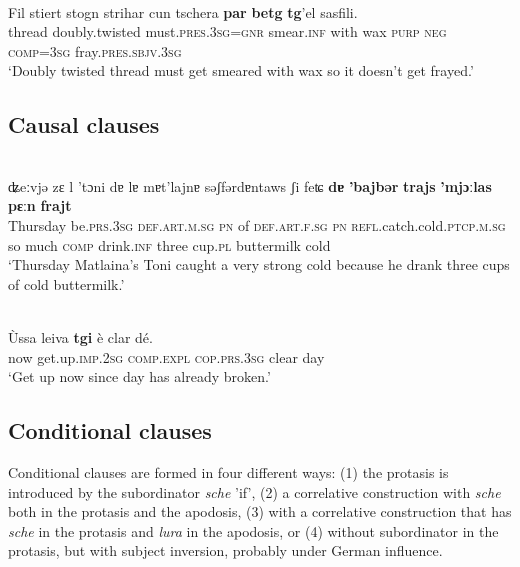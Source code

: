 \ea\label{}
\\
\gll   Fil stiert stogn strihar cun tschera \textbf{par} \textbf{betg} \textbf{tg}’el sasfili.\\
     thread doubly.twisted must.\textsc{pres.3sg=gnr} smear.\textsc{inf} with wax \textsc{purp} \textsc{neg} \textsc{comp=3sg} fray.\textsc{pres.sbjv.3sg}\\
\glt `Doubly twisted thread must get smeared with wax so it doesn’t get frayed.'
\z






\subsection{Causal clauses}
 
 \ea\label{ex:1:}
 {\citealt[9]{Valär2013b}}\\
\gll ʥeːvjǝ zɛ l 'tɔni dɐ lɐ mɐt'lajnɐ sǝʃfǝrdɐntaws ʃi feʨ \textbf{dɐ} \textbf{'bajbǝr} \textbf{trajs} \textbf{'mjɔːlas} \textbf{pɛːn} \textbf{frajt} \\
 Thursday  be.\textsc{prs.3sg}  \textsc{def.art.m.sg} \textsc{pn} of \textsc{def.art.f.sg} \textsc{pn} \textsc{refl}.catch.cold.\textsc{ptcp.m.sg} so much \textsc{comp} drink.\textsc{inf} three cup.\textsc{pl}  buttermilk cold  \\
\glt `Thursday Matlaina’s Toni caught a very strong cold because he drank three cups of cold buttermilk.'
\z

\ea\label{}
\\
\gll Ùssa leiva \textbf{tgi} è clar dé.\\
  now get.up.\textsc{imp.2sg} \textsc{comp.expl} \textsc{cop.prs.3sg} clear day\\
\glt `Get up now since day has already broken.'
\z




\subsection{Conditional clauses}
Conditional clauses are formed in four different ways: (1) the protasis is introduced by the subordinator \textit{sche} 'if', (2) a correlative construction with \textit{sche} both in the protasis and the apodosis, (3) with a correlative construction that has \textit{sche} in the protasis and \textit{lura} in the apodosis, or (4) without subordinator in the protasis, but with subject inversion, probably under German influence.

